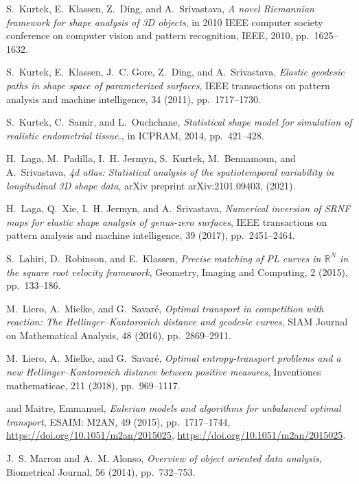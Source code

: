 \documentclass[final,hidelinks,onefignum,onetabnum]{siamart220329}
\begin{document}
\begin{thebibliography}{10}
{\sc S.~Kurtek, E.~Klassen, Z.~Ding, and A.~Srivastava}, {\em A novel {R}iemannian framework for shape analysis of 3{D} objects}, in 2010 IEEE computer society conference on computer vision and pattern recognition, IEEE, 2010, pp.~1625--1632.

{\sc S.~Kurtek, E.~Klassen, J.~C. Gore, Z.~Ding, and A.~Srivastava}, {\em Elastic geodesic paths in shape space of parameterized surfaces}, IEEE transactions on pattern analysis and machine intelligence, 34 (2011), pp.~1717--1730.

{\sc S.~Kurtek, C.~Samir, and L.~Ouchchane}, {\em Statistical shape model for simulation of realistic endometrial tissue.}, in ICPRAM, 2014, pp.~421--428.

{\sc H.~Laga, M.~Padilla, I.~H. Jermyn, S.~Kurtek, M.~Bennamoun, and A.~Srivastava}, {\em 4d atlas: Statistical analysis of the spatiotemporal variability in longitudinal 3{D} shape data}, arXiv preprint arXiv:2101.09403,  (2021).

{\sc H.~Laga, Q.~Xie, I.~H. Jermyn, and A.~Srivastava}, {\em Numerical inversion of {SRNF} maps for elastic shape analysis of genus-zero surfaces}, IEEE transactions on pattern analysis and machine intelligence, 39 (2017), pp.~2451--2464.

{\sc S.~Lahiri, D.~Robinson, and E.~Klassen}, {\em {Precise matching of PL curves in $\mathbb{R}^N$ in the square root velocity framework}}, Geometry, Imaging and Computing, 2 (2015), pp.~133--186.

{\sc M.~Liero, A.~Mielke, and G.~Savar{\'e}}, {\em Optimal transport in competition with reaction: The {H}ellinger--{K}antorovich distance and geodesic curves}, SIAM Journal on Mathematical Analysis, 48 (2016), pp.~2869--2911.

{\sc M.~Liero, A.~Mielke, and G.~Savar{\'e}}, {\em Optimal entropy-transport problems and a new {H}ellinger--{K}antorovich distance between positive measures}, Inventiones mathematicae, 211 (2018), pp.~969--1117.

{ and {Maitre, Emmanuel}}, {\em Eulerian models and algorithms for unbalanced optimal transport}, ESAIM: M2AN, 49 (2015), pp.~1717--1744, \url{https://doi.org/10.1051/m2an/2015025}, \url{https://doi.org/10.1051/m2an/2015025}.

{\sc J.~S. Marron and A.~M. Alonso}, {\em Overview of object oriented data analysis}, Biometrical Journal, 56 (2014), pp.~732--753.


\end{thebibliography}
\end{document}
